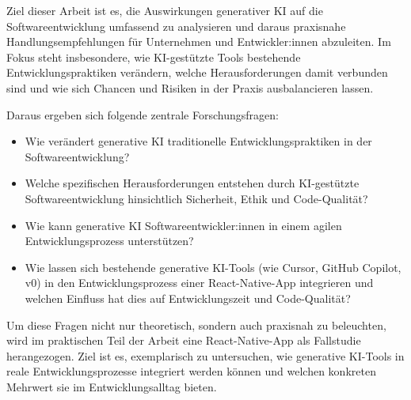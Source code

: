 
Ziel dieser Arbeit ist es, die Auswirkungen generativer KI auf die
Softwareentwicklung umfassend zu analysieren und daraus praxisnahe
Handlungsempfehlungen für Unternehmen und Entwickler:innen abzuleiten. Im Fokus
steht insbesondere, wie KI-gestützte Tools bestehende Entwicklungspraktiken
verändern, welche Herausforderungen damit verbunden sind und wie sich Chancen
und Risiken in der Praxis ausbalancieren lassen.

Daraus ergeben sich folgende zentrale Forschungsfragen:
\begin{itemize}
    \item Wie verändert generative KI traditionelle Entwicklungspraktiken in der
          Softwareentwicklung?
    \item Welche spezifischen Herausforderungen entstehen durch KI-gestützte
          Softwareentwicklung hinsichtlich Sicherheit, Ethik und Code-Qualität?
    \item Wie kann generative KI Softwareentwickler:innen in einem agilen
          Entwicklungsprozess unterstützen?
    \item Wie lassen sich bestehende generative KI-Tools (wie Cursor, GitHub Copilot, v0)
          in den Entwicklungsprozess einer React-Native-App integrieren und welchen
          Einfluss hat dies auf Entwicklungszeit und Code-Qualität?
\end{itemize}

Um diese Fragen nicht nur theoretisch, sondern auch praxisnah zu beleuchten,
wird im praktischen Teil der Arbeit eine React-Native-App als Fallstudie
herangezogen. Ziel ist es, exemplarisch zu untersuchen, wie generative KI-Tools
in reale Entwicklungsprozesse integriert werden können und welchen konkreten
Mehrwert sie im Entwicklungsalltag bieten.
